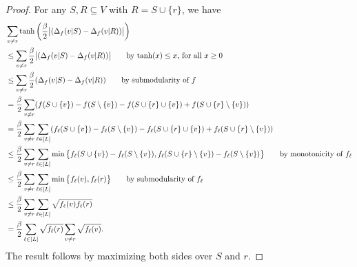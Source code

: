 \begin{proof}
  For any $S, R \subseteq V$ with $R = S \cup \{r\}$, we have
  \begin{align*}
  	&\sum_{v \neq r} \tanh \left(\frac{\beta}{2}\big|(\D_f(v|S) - \D_f(v|R)) \big|\right)\\
    &\leq \sum_{v \neq r} \frac{\beta}{2}\big|(\D_f(v|S) - \D_f(v|R)) \big| \tag*{by $\tanh(x) \leq x$, for all $x \geq 0$}\\
    &\leq \sum_{v \neq r} \frac{\beta}{2}(\D_f(v|S) - \D_f(v|R)) \tag*{by submodularity of $f$}\\
    &= \frac{\beta}{2}\sum_{v \neq r}(f(S \cup \{v\}) - f(S \setminus \{v\}) - f(S \cup \{r\} \cup \{v\}) + f(S \cup \{r\} \setminus \{v\}))\\
    &= \frac{\beta}{2}\sum_{v \neq r}\sum_{\ell \in [L]}(f_{\ell}(S \cup \{v\}) - f_{\ell}(S \setminus \{v\}) - f_{\ell}(S \cup \{r\} \cup \{v\}) + f_{\ell}(S \cup \{r\} \setminus \{v\}))\\
    &\leq \frac{\beta}{2}\sum_{v \neq r}\sum_{\ell \in [L]}\min\big\{f_{\ell}(S \cup \{v\}) - f_{\ell}(S \setminus \{v\}), f_{\ell}(S \cup \{r\} \setminus \{v\}) - f_{\ell}(S \setminus \{v\})\big\} \tag*{by monotonicity of $f_{\ell}$}\\
    &\leq \frac{\beta}{2}\sum_{v \neq r}\sum_{\ell \in [L]}\min\big\{f_{\ell}(v), f_{\ell}(r)\big\} \tag*{by submodularity of $f_{\ell}$}\\
    &\leq \frac{\beta}{2}\sum_{v \neq r}\sum_{\ell \in [L]}\sqrt{f_{\ell}(v) f_{\ell}(r)}\\
    &= \frac{\beta}{2}\sum_{\ell \in [L]}\sqrt{f_{\ell}(r)}\sum_{v \neq r}\sqrt{ f_{\ell}(v)}.
  \end{align*}
  The result follows by maximizing both sides over $S$ and $r$.
\end{proof}

